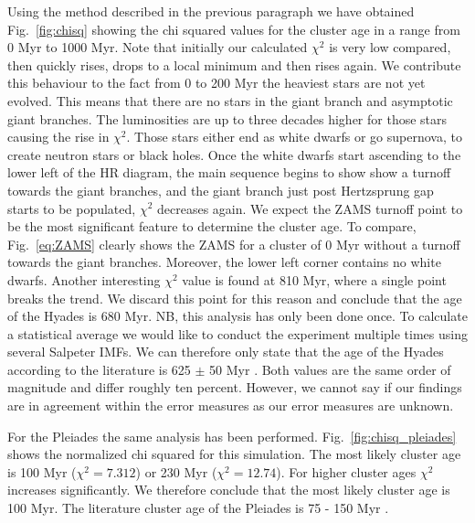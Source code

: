 \documentclass{aa}
\begin{document}
Using the method described in the previous paragraph we have obtained Fig.~\ref{fig:chisq} showing the chi squared values for the cluster age in a range from 0 Myr to 1000 Myr. Note that initially our calculated $\chi^2$ is very low compared, then quickly rises, drops to a local minimum and then rises again. We contribute this behaviour to the fact from 0 to 200 Myr the heaviest stars are not yet evolved. This means that there are no stars in the giant branch and asymptotic giant branches. The luminosities are up to three decades higher for those stars causing the rise in $\chi^2$. Those stars either end as white dwarfs or go supernova, to create neutron stars or black holes. Once the white dwarfs start ascending to the lower left of the HR diagram, the main sequence begins to show show a turnoff towards the giant branches, and the giant branch just post Hertzsprung gap starts to be populated, $\chi^2$ decreases again. We expect the ZAMS turnoff point to be the most significant feature to determine the cluster age. To compare, Fig.~\ref{eq:ZAMS} clearly shows the ZAMS for a cluster of 0 Myr without a turnoff towards the giant branches. Moreover, the lower left corner contains no white dwarfs. Another interesting $\chi^2$ value is found at 810 Myr, where a single point breaks the trend. We discard this point for this reason and conclude that the age of the Hyades is 680 Myr. NB, this analysis has only been done once. To calculate a statistical average we would like to conduct the experiment multiple times using several Salpeter IMFs. We can therefore only state that the age of the Hyades according to the literature is 625 $\pm$ 50 Myr \citep{1998A&A...331...81P}. Both values are the same order of magnitude and differ roughly ten percent. However, we cannot say if our findings are in agreement within the error measures as our error measures are unknown.

For the Pleiades the same analysis has been performed. Fig.~\ref{fig:chisq_pleiades} shows the normalized chi squared for this simulation. The most likely cluster age is 100 Myr ($\chi^2 = 7.312$) or 230 Myr ($\chi^2 = 12.74$). For higher cluster ages $\chi^2$ increases significantly. We therefore conclude that the most likely cluster age is 100 Myr. The literature cluster age of the Pleiades is 75 - 150 Myr \citep[e.g.][]{1998ApJ...497..253U}.
\end{document}
